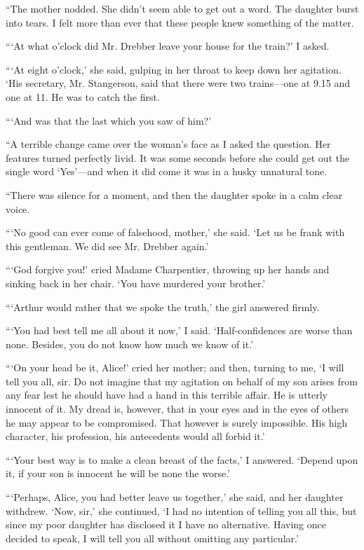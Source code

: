 \documentclass[12pt]{book}
\begin{document}
“The mother nodded. She didn’t seem able to get out a word. The daughter burst into tears. I felt more than ever that these people knew something of the matter. 

“‘At what o’clock did Mr. Drebber leave your house for the train?’ I asked. 

“‘At eight o’clock,’ she said, gulping in her throat to keep down her agitation. ‘His secretary, Mr. Stangerson, said that there were two trains—one at 9.15 and one at 11. He was to catch the first. 

“‘And was that the last which you saw of him?’ 

“A terrible change came over the woman’s face as I asked the question. Her features turned perfectly livid. It was some seconds before she could get out the single word ‘Yes’—and when it did come it was in a husky unnatural tone. 

“There was silence for a moment, and then the daughter spoke in a calm clear voice. 

“‘No good can ever come of falsehood, mother,’ she said. ‘Let us be frank with this gentleman. We did see Mr. Drebber again.’ 

“‘God forgive you!’ cried Madame Charpentier, throwing up her hands and sinking back in her chair. ‘You have murdered your brother.’ 

“‘Arthur would rather that we spoke the truth,’ the girl answered firmly. 

“‘You had best tell me all about it now,’ I said. ‘Half-confidences are worse than none. Besides, you do not know how much we know of it.’ 

“‘On your head be it, Alice!’ cried her mother; and then, turning to me, ‘I will tell you all, sir. Do not imagine that my agitation on behalf of my son arises from any fear lest he should have had a hand in this terrible affair. He is utterly innocent of it. My dread is, however, that in your eyes and in the eyes of others he may appear to be compromised. That however is surely impossible. His high character, his profession, his antecedents would all forbid it.’ 

“‘Your best way is to make a clean breast of the facts,’ I answered. ‘Depend upon it, if your son is innocent he will be none the worse.’ 

“‘Perhaps, Alice, you had better leave us together,’ she said, and her daughter withdrew. ‘Now, sir,’ she continued, ‘I had no intention of telling you all this, but since my poor daughter has disclosed it I have no alternative. Having once decided to speak, I will tell you all without omitting any particular.’ 
\end{document}
